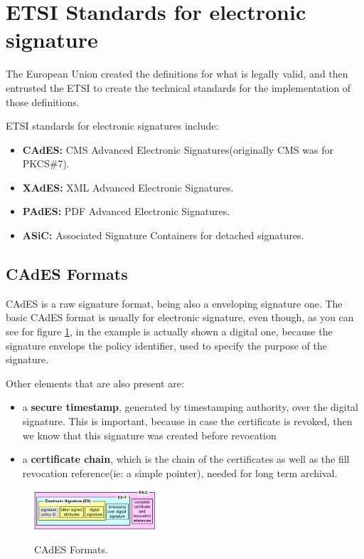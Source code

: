 \section{ETSI Standards for electronic signature}
The European Union created the definitions for what is legally valid,
and then entrusted the ETSI to create the technical standards for the
implementation of those definitions.

ETSI standards for electronic signatures include:
\begin{itemize}
    \item \textbf{CAdES:} CMS Advanced Electronic
      Signatures(originally CMS was for PKCS\#7).
    \item \textbf{XAdES:} XML Advanced Electronic Signatures.
    \item \textbf{PAdES:} PDF Advanced Electronic Signatures.
    \item \textbf{ASiC:} Associated Signature Containers for detached signatures.
\end{itemize}

\subsection{CAdES Formats}
CAdES is a raw signature format, being also a enveloping signature
one. The basic CAdES format is usually for electronic signature, even
though, as you can see for figure \ref{fig:cades format}, in the
example is actually shown a digital one, because the signature
envelops the policy identifier, used to specify the purpose of the 
signature.

Other elements that are also present are:
\begin{itemize}
  \item a \textbf{secure timestamp}, generated by timestamping
    authority, over the digital signature. This is important, because
    in case the certificate is revoked, then we know that this
    signature was created before revocation
  \item a \textbf{certificate chain}, which is the chain of the
    certificates as well as the fill revocation reference(ie: a simple
    pointer), needed for long term archival.

\end{itemize}

\begin{figure}[H]
  \centering
  \includegraphics[width=0.4\textwidth]{img/cades format.png}
  \label{fig:cades format}
  \caption{CAdES Formats.}
\end{figure}

